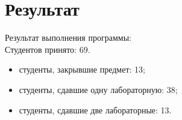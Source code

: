 \chapter{Результат}

\noindent Результат выполнения программы:\\
Студентов принято: 69.
\begin{itemize}
	\item студенты, закрывшие предмет: 13;
	\item студенты, сдавшие одну лабораторную: 38;
	\item студенты, сдавшие две лабораторные: 13.
\end{itemize}


